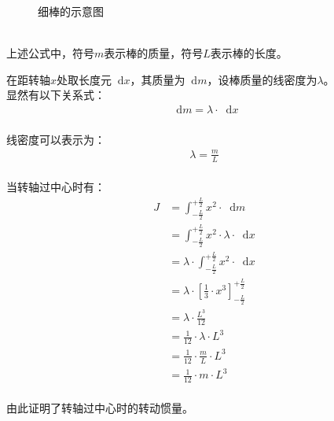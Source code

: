 \documentclass[UTF8]{ctexart}
\newcommand*{\dif}{\mathop{}\!\mathrm{d}}
\begin{document}
\begin{figure}[h]
\begin{center}
{
            }
            \caption{细棒的示意图}
        \end{center}
    \end{figure}\\
    上述公式中，符号$m$表示棒的质量，符号$L$表示棒的长度。

\newpage

    在距转轴$x$处取长度元$\dif x$，其质量为$\dif m$，设棒质量的线密度为$\lambda$。\\[3mm]
    显然有以下关系式：
    \setcounter{equation}{0}
    \begin{align}
        \dif m=\lambda\cdot\dif x
    \end{align}\\
    线密度可以表示为：
    \begin{align}
        \lambda=\frac{m}{L}
    \end{align}\\
    当转轴过中心时有：
    \begin{align}
        J
        &=\int_{-\frac{L}{2}}^{+\frac{L}{2}}x^2\cdot\dif m\\[3mm]
        &=\int_{-\frac{L}{2}}^{+\frac{L}{2}}x^2\cdot\lambda\cdot\dif x\\[3mm]
        &=\lambda\cdot\int_{-\frac{L}{2}}^{+\frac{L}{2}}x^2\cdot\dif x\\[3mm]
        &=\lambda\cdot\left[\frac{1}{3}\cdot x^3\right]_{-\frac{L}{2}}^{+\frac{L}{2}}\\[3mm]
        &=\lambda\cdot\frac{L^3}{12}\\[3mm]
        &=\frac{1}{12}\cdot\lambda\cdot L^3\\[3mm]
        &=\frac{1}{12}\cdot\frac{m}{L}\cdot L^3\\[3mm]
        &=\frac{1}{12}\cdot m\cdot L^3
    \end{align}\\
    由此证明了转轴过中心时的转动惯量。

\newpage
\end{document}
